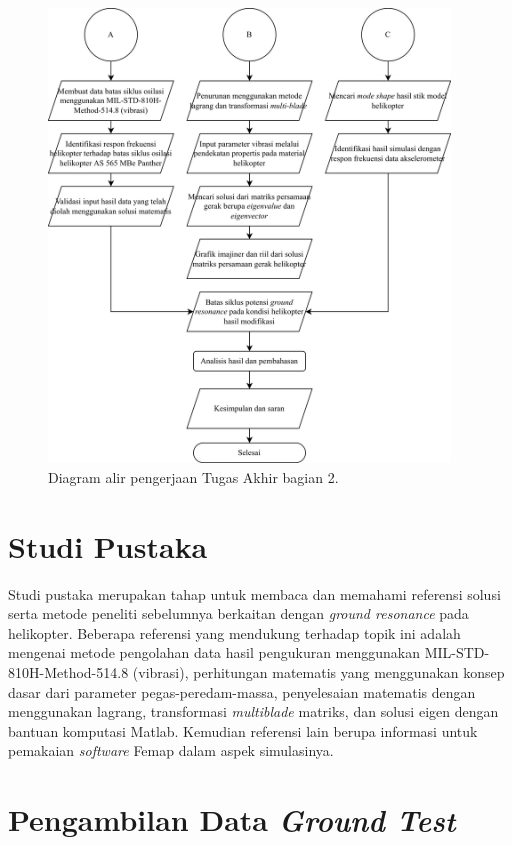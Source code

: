 \begin{figure}[H]
	\centering
	\includegraphics[width=0.95\textwidth]{gambar/TA_flow-Page-2.jpg}
	\caption{Diagram alir pengerjaan Tugas Akhir bagian 2.}
	\label{fig:TA_flow-Page-2.jpg}
\end{figure}

\section{Studi Pustaka}
\label{sec:studipustaka}

Studi pustaka merupakan tahap untuk membaca dan memahami referensi solusi serta metode peneliti sebelumnya berkaitan dengan \textit{ground resonance} pada helikopter. Beberapa referensi yang mendukung terhadap topik ini adalah mengenai metode pengolahan data hasil pengukuran menggunakan MIL-STD-810H-Method-514.8 (vibrasi), perhitungan matematis yang menggunakan konsep dasar dari parameter pegas-peredam-massa, penyelesaian matematis dengan menggunakan lagrang, transformasi \textit{multiblade} matriks, dan solusi eigen dengan bantuan komputasi Matlab. Kemudian referensi lain berupa informasi untuk pemakaian \textit{software} Femap dalam aspek simulasinya.

\section{Pengambilan Data \textit{Ground Test}}
  \label{sec:pengukurandata}

